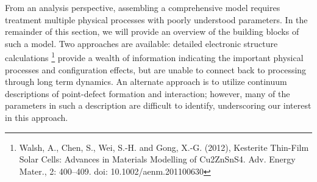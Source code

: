 \documentclass[11pt]{article}
\begin{document}
  From an analysis perspective, assembling a comprehensive model
  requires treatment multiple physical processes with poorly
  understood parameters. In the remainder of this section, we will
  provide an overview of the building blocks of such a model. Two
  approaches are available: detailed electronic structure calculations
  \footnote{Walsh, A., Chen, S., Wei, S.-H. and Gong, X.-G. (2012),
    Kesterite Thin-Film Solar Cells: Advances in Materials Modelling
    of Cu2ZnSnS4. Adv. Energy Mater., 2: 400–409. doi:
    10.1002/aenm.201100630} provide a wealth of information indicating
  the important physical processes and configuration effects, but are
  unable to connect back to processing through long term dynamics. An
  alternate approach is to utilize continuum descriptions of
  point-defect formation and interaction; however, many of the
  parameters in such a description are difficult to identify,
  underscoring our interest in this approach.
\end{document}
